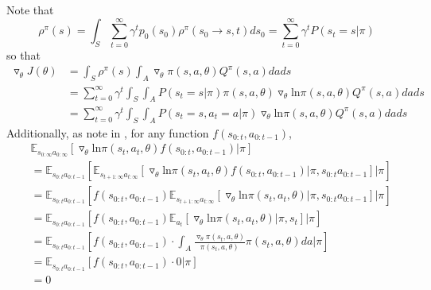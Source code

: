 \documentclass[11pt]{article}
\theoremstyle{definition}
\begin{document}
Note that 
\begin{equation}
\rho^{\pi}(s) = \int_S \sum_{t=0}^{\infty} \gamma^t p_0(s_0) \rho^{\pi}(s_0 \rightarrow s, t) ds_0
= \sum_{t=0}^{\infty} \gamma^t P \left( s_t = s | \pi \right)
\end{equation}
so that
\begin{equation}
\begin{split}
\triangledown_{\theta} J ( \theta ) 
&= \int_S \rho^{\pi}(s) \int_A \triangledown_{\theta} \pi(s,a,\theta) Q^{\pi}(s,a)dads
\\
&= \sum_{t=0}^{\infty} \gamma^t \int_S \int_A P \left( s_t = s | \pi \right) \pi(s,a,\theta) \triangledown_{\theta} \mathrm{ln}\pi(s,a,\theta) Q^{\pi} (s,a)dads
\\
&= \sum_{t=0}^{\infty} \gamma^t \int_S \int_A P \left( s_t = s, a_t = a | \pi \right) \triangledown_{\theta} \mathrm{ln}\pi(s,a,\theta) Q^{\pi} (s,a)dads
\end{split}
\end{equation}
Additionally, as note in \cite{schulman2015}, for any function $f(s_{0:t},a_{0:t-1})$, 
\begin{equation}
\begin{aligned}
& \mathbb{E}_{s_{0:\infty}a_{0:\infty}} \left[ \triangledown_{\theta} \mathrm{ln} \pi (s_t,a_t,\theta) f(s_{0:t},a_{0:t-1}) | \pi \right] \\
&= \mathbb{E}_{s_{0:t}a_{0:t-1}} \left[
\mathbb{E}_{s_{t+1:\infty}a_{t:\infty}} \left[
\triangledown_{\theta} \mathrm{ln}\pi(s_t,a_t,\theta) f(s_{0:t},a_{0:t-1}) | \pi, s_{0:t}a_{0:t-1}
\right] | \pi
\right]
\\
&= \mathbb{E}_{s_{0:t}a_{0:t-1}} \left[ f(s_{0:t},a_{0:t-1})
\mathbb{E}_{s_{t+1:\infty}a_{t:\infty}}  \left[
\triangledown_{\theta} \mathrm{ln}\pi(s_t,a_t,\theta) | \pi, s_{0:t}a_{0:t-1}
\right] | \pi
\right]
\\
&= \mathbb{E}_{s_{0:t}a_{0:t-1}} \left[ f(s_{0:t},a_{0:t-1})
\mathbb{E}_{a_t}  \left[
\triangledown_{\theta} \mathrm{ln}\pi(s_t,a_t,\theta) | \pi, s_t
\right] | \pi
\right]
\\
&= \mathbb{E}_{s_{0:t}a_{0:t-1}} \left[ f(s_{0:t},a_{0:t-1})
\cdot \int_A \frac{\triangledown_{\theta} \pi (s_t,a,\theta)}{\pi (s_t,a,\theta)} \pi (s_t,a,\theta) da \vert \pi
\right]
\\
&= \mathbb{E}_{s_{0:t}a_{0:t-1}} \left[ f(s_{0:t},a_{0:t-1})
\cdot 0 | \pi
\right]
\\
&= 0
\end{aligned}
\end{equation}
\end{document}
